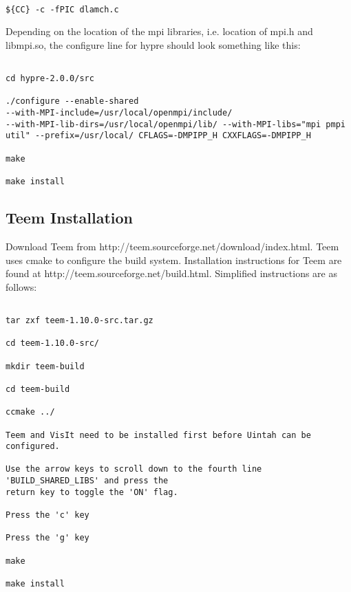 \begin{verbatim}

${CC} -c -fPIC dlamch.c

\end{verbatim}

Depending on the location of the mpi libraries, i.e. location of mpi.h
and libmpi.so, the configure line for hypre should look something like this:

\begin{Verbatim}

cd hypre-2.0.0/src

./configure --enable-shared
--with-MPI-include=/usr/local/openmpi/include/
--with-MPI-lib-dirs=/usr/local/openmpi/lib/ --with-MPI-libs="mpi pmpi
util" --prefix=/usr/local/ CFLAGS=-DMPIPP_H CXXFLAGS=-DMPIPP_H

make

make install

\end{Verbatim}

 

\subsection{Teem Installation}
\label{sec:teem}


Download Teem from http://teem.sourceforge.net/download/index.html.  Teem uses cmake to configure the build system. Installation instructions for Teem are found at http://teem.sourceforge.net/build.html.  Simplified instructions are as follows:

\begin{verbatim}

tar zxf teem-1.10.0-src.tar.gz

cd teem-1.10.0-src/

mkdir teem-build

cd teem-build

ccmake ../

Teem and VisIt need to be installed first before Uintah can be configured.

Use the arrow keys to scroll down to the fourth line 'BUILD_SHARED_LIBS' and press the 
return key to toggle the 'ON' flag.

Press the 'c' key

Press the 'g' key

make

make install

\end{verbatim}

